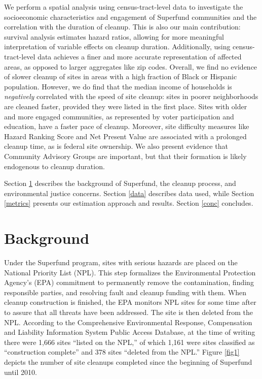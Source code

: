 \documentclass[12pt]{article}
\begin{document}
We perform a spatial analysis using census-tract-level data to investigate the socioeconomic characteristics and engagement of Superfund communities and the correlation with the duration of cleanup. This is also our main contribution: survival analysis estimates hazard ratios, allowing for more meaningful interpretation of variable effects on cleanup duration. Additionally, using census-tract-level data achieves a finer and more accurate representation of affected areas, as opposed to larger aggregates like zip codes. Overall, we find no evidence of slower cleanup of sites in areas with a high fraction of Black or Hispanic population. However, we do find that the median income of households is {\it negatively} correlated with the speed of site cleanup: sites in poorer neighborhoods are cleaned faster, provided they were listed in the first place. Sites with older and more engaged communities, as represented by voter participation and education, have a faster pace of cleanup. Moreover, site difficulty measures like Hazard Ranking Score and Net Present Value  are associated with a prolonged cleanup time, as is federal site ownership. We also present evidence that Community Advisory Groups are important, but that their formation is likely endogenous to cleanup duration.

Section \ref{lit} describes the background of Superfund, the cleanup process, and environmental justice concerns. Section \ref{data} describes data used, while Section \ref{metrics} presents our estimation approach and results. Section \ref{conc} concludes. 
 
\section{Background}\label{lit}


Under the Superfund program, sites with serious hazards are placed on the National Priority List (NPL). This step formalizes the Environmental Protection Agency's (EPA) commitment to permanently remove the contamination, finding responsible parties, and resolving fault and cleanup funding with them. When cleanup construction is finished, the EPA monitors NPL sites for some time after to assure that all threats have been addressed. The site is then deleted from the NPL. According to the Comprehensive Environmental Response, Compensation and Liability Information System Public Access Database, at the time of writing there were 1,666 sites ``listed on the NPL,'' of which 1,161 were sites classified as ``construction complete'' and 378 sites ``deleted from the NPL.'' Figure \ref{fig1} depicts the number of site cleanups completed since the beginning of Superfund until 2010.
\end{document}
